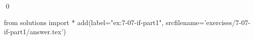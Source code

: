 
\begin{ex}
  \label{ex:7-07-if-part1}
  
  \qed
\end{ex}
\begin{python0}
from solutions import *
add(label="ex:7-07-if-part1",
    srcfilename='exercises/7-07-if-part1/answer.tex')
\end{python0}
